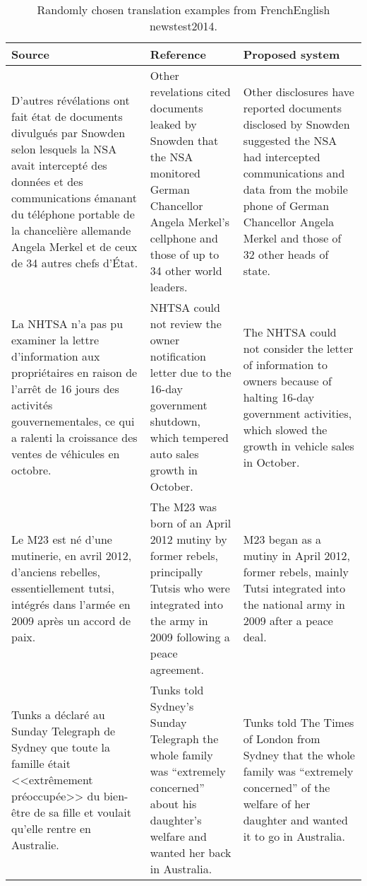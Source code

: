 \documentclass[11pt,a4paper]{article}
\begin{document}
\begin{table*}[t]
\begin{small}
\begin{center}
  \begin{tabular}{p{4.8cm}p{4.8cm}p{4.8cm}}
    \toprule
    \bf Source & \bf Reference & \bf Proposed system \\
    \midrule
    D'autres révélations ont fait état de documents divulgués par Snowden selon lesquels la NSA avait intercepté des données et des communications émanant du téléphone portable de la chancelière allemande Angela Merkel et de ceux de 34 autres chefs d'État. & Other revelations cited documents leaked by Snowden that the NSA monitored German Chancellor Angela Merkel's cellphone and those of up to 34 other world leaders. & Other disclosures have reported documents disclosed by Snowden suggested the NSA had intercepted communications and data from the mobile phone of German Chancellor Angela Merkel and those of 32 other heads of state. \\
    \midrule
	La NHTSA n'a pas pu examiner la lettre d'information aux propriétaires en raison de l'arrêt de 16 jours des activités gouvernementales, ce qui a ralenti la croissance des ventes de véhicules en octobre. & NHTSA could not review the owner notification letter due to the 16-day government shutdown, which tempered auto sales growth in October. & The NHTSA could not consider the letter of information to owners because of halting 16-day government activities, which slowed the growth in vehicle sales in October. \\
    \midrule
    Le M23 est né d'une mutinerie, en avril 2012, d'anciens rebelles, essentiellement tutsi, intégrés dans l'armée en 2009 après un accord de paix. & The M23 was born of an April 2012 mutiny by former rebels, principally Tutsis who were integrated into the army in 2009 following a peace agreement. & M23 began as a mutiny in April 2012, former rebels, mainly Tutsi integrated into the national army in 2009 after a peace deal. \\
    \midrule
	Tunks a déclaré au Sunday Telegraph de Sydney que toute la famille était <<extrêmement préoccupée>> du bien-être de sa fille et voulait qu'elle rentre en Australie. & Tunks told Sydney's Sunday Telegraph the whole family was ``extremely concerned'' about his daughter's welfare and wanted her back in Australia. & Tunks told The Times of London from Sydney that the whole family was ``extremely concerned'' of the welfare of her daughter and wanted it to go in Australia. \\
    \bottomrule
  \end{tabular}
\end{center}
\end{small}
\caption{Randomly chosen translation examples from FrenchEnglish newstest2014.} \label{tab:examples}
\end{table*}
\end{document}
